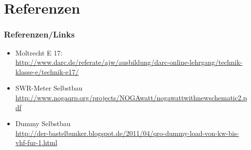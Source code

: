 \section*{Referenzen}

\begin{frame}
    \frametitle{Referenzen/Links}
    
    \footnotesize
    \begin{itemize}
        \item Moltrecht E 17: \\
              \url{http://www.darc.de/referate/ajw/ausbildung/darc-online-lehrgang/technik-klasse-e/technik-e17/}
         \item SWR-Meter Selbstbau \\
         	\url{http://www.nogaqrp.org/projects/NOGAwatt/nogawattwithnewschematic2.pdf}
         \item Dummy Selbstbau \\
         	\url{http://der-bastelbunker.blogspot.de/2011/04/qro-dummy-load-von-kw-bis-vhf-fur-1.html}
    \end{itemize}

\end{frame}


